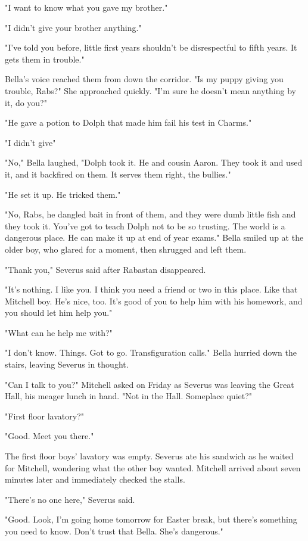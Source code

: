 "I want to know what you gave my brother."

"I didn't give your brother anything."

"I've told you before, little first years shouldn't be disrespectful to fifth years. It gets them in trouble."

Bella's voice reached them from down the corridor. "Is my puppy giving you trouble, Rabs?" She approached quickly. "I'm sure he doesn't mean anything by it, do you?"

"He gave a potion to Dolph that made him fail his test in Charms."

"I didn't give{\el}"

"No," Bella laughed, "Dolph took it. He and cousin Aaron. They took it and used it, and it backfired on them. It serves them right, the bullies."

"He set it up. He tricked them."

"No, Rabs, he dangled bait in front of them, and they were dumb little fish and they took it. You've got to teach Dolph not to be so trusting. The world is a dangerous place. He can make it up at end of year exams." Bella smiled up at the older boy, who glared for a moment, then shrugged and left them.

"Thank you," Severus said after Rabastan disappeared.

"It's nothing. I like you. I think you need a friend or two in this place. Like that Mitchell boy. He's nice, too. It's good of you to help him with his homework, and you should let him help you."

"What can he{\el} help me with?"

"I don't know. Things. Got to go. Transfiguration calls." Bella hurried down the stairs, leaving Severus in thought.

"Can I talk to you?" Mitchell asked on Friday as Severus was leaving the Great Hall, his meager lunch in hand. "Not in the Hall. Someplace quiet?"

"First floor{\el} lavatory?"

"Good. Meet you there."

The first floor boys' lavatory was empty. Severus ate his sandwich as he waited for Mitchell, wondering what the other boy wanted. Mitchell arrived about seven minutes later and immediately checked the stalls.

"There's no{\el} one here," Severus said.

"Good. Look, I'm going home tomorrow for Easter break, but there's something you need to know. Don't trust that Bella. She's dangerous."

